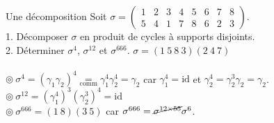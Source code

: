 \documentclass[11pt]{article}
\newcommand*{\id}{\text{id}}
\newcommand{\0}{\varnothing}
\newcommand*{\g}{\gamma}
\newcommand*{\s}{\sigma}
\begin{document}
\begin{ex}{Une décomposition}{}
    Soit $\s=\begin{pmatrix}1&2&3&4&5&6&7&8\\5&4&1&7&8&6&2&3\end{pmatrix}$.\\
    1. Décomposer $\s$ en produit de cycles à supports disjoints.\\
    2. Déterminer $\s^4$, $\s^{12}$ et $\s^{666}$.
    \tcblower
     $\s=(1~5~8~3)(2~4~7)$\\
    \\
    $\circledcirc ~ \s^4=(\g_1\g_2)^4\underset{\text{comm}}{=}\g_1^4\g_2^4=\g_2$ car $\g_1^4=\id$ et $\g_2^4=\g_2^3\g_2=\g_2$.\\
    $\circledcirc ~ \s^{12}=(\gamma_1^{4})^3(\g_2^3)^4=\id$\\
    $\circledcirc ~ \s^{666}=(1~8)(3~5)$ car $\s^{666}=\cancel{\s^{12\times55}}\s^6$.
\end{ex}
\end{document}
